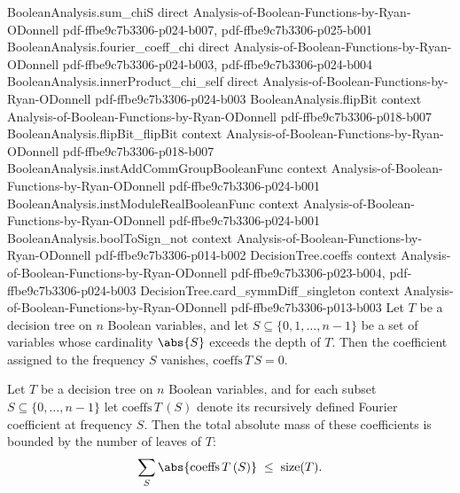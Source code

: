 \begin{lemma}
\proofstep
  {BooleanAnalysis.sum_chiS}
  {direct}
  {Analysis-of-Boolean-Functions-by-Ryan-ODonnell}
  {pdf-ffbe9c7b3306-p024-b007,
    pdf-ffbe9c7b3306-p025-b001}
\proofstep
  {BooleanAnalysis.fourier_coeff_chi}
  {direct}
  {Analysis-of-Boolean-Functions-by-Ryan-ODonnell}
  {pdf-ffbe9c7b3306-p024-b003,
    pdf-ffbe9c7b3306-p024-b004}
\proofstep
  {BooleanAnalysis.innerProduct_chi_self}
  {direct}
  {Analysis-of-Boolean-Functions-by-Ryan-ODonnell}
  {pdf-ffbe9c7b3306-p024-b003}
\proofstep
  {BooleanAnalysis.flipBit}
  {context}
  {Analysis-of-Boolean-Functions-by-Ryan-ODonnell}
  {pdf-ffbe9c7b3306-p018-b007}
\proofstep
  {BooleanAnalysis.flipBit_flipBit}
  {context}
  {Analysis-of-Boolean-Functions-by-Ryan-ODonnell}
  {pdf-ffbe9c7b3306-p018-b007}
\proofstep
  {BooleanAnalysis.instAddCommGroupBooleanFunc}
  {context}
  {Analysis-of-Boolean-Functions-by-Ryan-ODonnell}
  {pdf-ffbe9c7b3306-p024-b001}
\proofstep
  {BooleanAnalysis.instModuleRealBooleanFunc}
  {context}
  {Analysis-of-Boolean-Functions-by-Ryan-ODonnell}
  {pdf-ffbe9c7b3306-p024-b001}
\proofstep
  {BooleanAnalysis.boolToSign_not}
  {context}
  {Analysis-of-Boolean-Functions-by-Ryan-ODonnell}
  {pdf-ffbe9c7b3306-p014-b002}
\proofstep
  {DecisionTree.coeffs}
  {context}
  {Analysis-of-Boolean-Functions-by-Ryan-ODonnell}
  {pdf-ffbe9c7b3306-p023-b004,
    pdf-ffbe9c7b3306-p024-b003}
\proofstep
  {DecisionTree.card_symmDiff_singleton}
  {context}
  {Analysis-of-Boolean-Functions-by-Ryan-ODonnell}
  {pdf-ffbe9c7b3306-p013-b003}
Let $T$ be a decision tree on $n$ Boolean variables, and let $S \subseteq
\{0,1,\dots,n-1\}$ be a set of variables whose cardinality $\abs{S}$ exceeds the depth
of $T$. Then the coefficient assigned to the frequency $S$ vanishes,
$\mathrm{coeffs}\,T\,S = 0$.
\end{lemma}

\begin{lemma}
\label{DecisionTree.sum_abs_coeffs_le}
\leanok
{}
Let $T$ be a decision tree on $n$ Boolean variables, and for each subset $S \subseteq
\{0,\dots,n-1\}$ let $\mathrm{coeffs}\,T\,(S)$ denote its recursively defined Fourier
coefficient at frequency $S$. Then the total absolute mass of these coefficients is
bounded by the number of leaves of $T$:
\[
\sum_{S} \abs{\mathrm{coeffs}\,T\,(S)} \;\le\; \mathrm{size}(T).
\]
\end{lemma}

